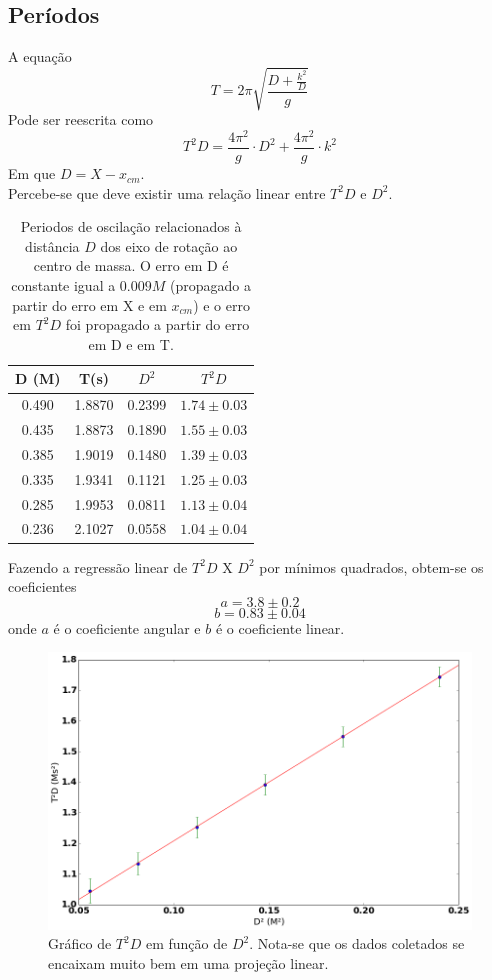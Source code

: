 \documentclass[12pt,a4paper]{article}
\begin{document}
\subsection{Períodos}
A equação $$ T = 2\pi\sqrt{\frac{D + \frac{k^2}{D}}{g}} $$ 
Pode ser reescrita como 
\begin{equation} \label{eq:funcao}
 T^2D = \frac{4\pi^2}{g} \cdot D^2 + \frac{4\pi^2}{g} \cdot k^2 
\end{equation}
Em que $D = X - x_{cm} $.\\
Percebe-se que deve existir uma relação linear entre $T^2D$ e $D^2$.


  
\begin{table}[!htbp]
\def\arraystretch{1.5}
\begin{tabular}{|c|c|c|c|}
\hline
D (M)& T(s) & $D^2$ & $T^2D$ \\
\hline
0.490 & 1.8870 & 0.2399 & $1.74 \pm 0.03$\\
\hline
0.435 & 1.8873 & 0.1890 & $1.55 \pm 0.03$\\
\hline
0.385 & 1.9019 & 0.1480 & $1.39 \pm 0.03$\\
\hline
0.335 & 1.9341 & 0.1121 & $1.25 \pm 0.03$\\
\hline
0.285 & 1.9953 & 0.0811 & $1.13 \pm 0.04$\\
\hline
0.236 & 2.1027 & 0.0558 & $1.04 \pm 0.04$\\
\hline
\end{tabular} 


\caption{Periodos de oscilação relacionados à distância $D$ dos eixo de rotação ao centro de massa. O erro em D é constante igual a $0.009 M$ (propagado a partir do erro em X e em $x_{cm}$) e o erro em $T^2D$ foi propagado a partir do erro em D e em T.}
\end{table}

Fazendo a regressão linear de $T^2D$ X $D^2$ por mínimos quadrados, obtem-se os coeficientes $$ a = 3.8 \pm 0.2 $$  $$ b = 0.83 \pm 0.04 $$ onde $a$ é o coeficiente angular e $b$ é o coeficiente linear.

\begin{figure}[!hbtbp]
\caption{Gráfico de $T^2D$ em função de $D^2$. Nota-se que os dados coletados se encaixam muito bem em uma projeção linear.}
\includegraphics[scale=0.55]{index.png} 

\end{figure}
\end{document}

